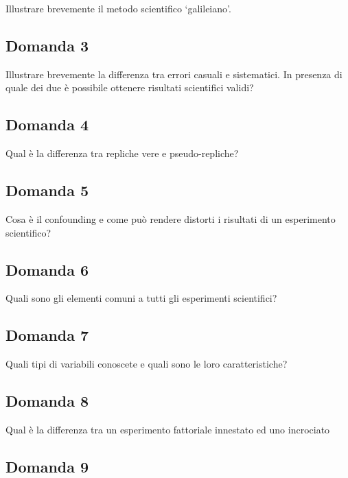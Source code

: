 \documentclass[
  12pt,
]{book}
\begin{document}
Illustrare brevemente il metodo scientifico `galileiano'.

\hypertarget{domanda-3}{%
\subsection{Domanda 3}\label{domanda-3}}

Illustrare brevemente la differenza tra errori casuali e sistematici. In presenza di quale dei due è possibile ottenere risultati scientifici validi?

\hypertarget{domanda-4}{%
\subsection{Domanda 4}\label{domanda-4}}

Qual è la differenza tra repliche vere e pseudo-repliche?

\hypertarget{domanda-5}{%
\subsection{Domanda 5}\label{domanda-5}}

Cosa è il confounding e come può rendere distorti i risultati di un esperimento scientifico?

\hypertarget{domanda-6}{%
\subsection{Domanda 6}\label{domanda-6}}

Quali sono gli elementi comuni a tutti gli esperimenti scientifici?

\hypertarget{domanda-7}{%
\subsection{Domanda 7}\label{domanda-7}}

Quali tipi di variabili conoscete e quali sono le loro caratteristiche?

\hypertarget{domanda-8}{%
\subsection{Domanda 8}\label{domanda-8}}

Qual è la differenza tra un esperimento fattoriale innestato ed uno incrociato

\hypertarget{domanda-9}{%
\subsection{Domanda 9}\label{domanda-9}}
\end{document}
